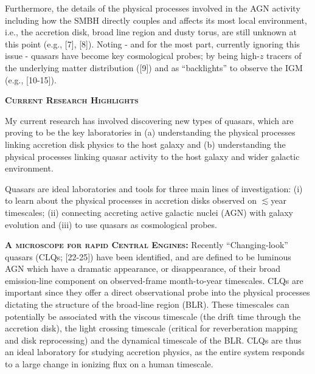 \documentclass[oneside, a4paper, onecolumn, 11pt]{article}
\begin{document}
\smallskip 
\smallskip
\noindent
Furthermore, the details of the physical processes involved in the AGN
activity including how the SMBH directly couples and affects its most
local environment, i.e., the accretion disk, broad line region and
dusty torus, are still unknown at this point (e.g., [7], [8]). Noting
- and for the most part, currently ignoring this issue - quasars have
become key cosmological probes; by being high-$z$ tracers of the
underlying matter distribution ([9]) and as ``backlights'' to observe
the IGM (e.g., [10-15]).



\medskip 
\medskip
\noindent
{\bfseries \large \textsc{\textcolor{Cerulean}{Current Research Highlights}}}

\smallskip
\smallskip
\noindent
My current research has involved discovering new types of quasars,
which are proving to be the key laboratories in (a) understanding the
physical processes linking accretion disk physics to the host galaxy
and (b) understanding the physical processes linking quasar activity
to the host galaxy and wider galactic environment.

\smallskip
\smallskip
\noindent
Quasars are ideal laboratories and tools for
three main lines of investigation: {\rm (i)} to learn about the
physical processes in accretion disks observed on $\lesssim$year
timescales; {\rm (ii)} connecting accreting active galactic nuclei
(AGN) with galaxy evolution and {\rm (iii)} to use quasars as
cosmological probes. 







\smallskip \smallskip
\smallskip
\smallskip
\noindent
\textbf{\textsc{A microscope for rapid Central Engines:}}
Recently ``Changing-look'' quasars (CLQs; [22-25]) have been
identified, and are defined to be luminous AGN which have a dramatic
appearance, or disappearance, of their broad emission-line component
on observed-frame month-to-year timescales.  CLQs are important since
they offer a direct observational probe into the physical processes
dictating the structure of the broad-line region (BLR). These
timescales can potentially be associated with the viscous timescale
(the drift time through the accretion disk), the light crossing
timescale (critical for reverberation mapping and disk reprocessing)
and the dynamical timescale of the BLR.  CLQs are thus an ideal
laboratory for studying accretion physics, as the entire system
responds to a large change in ionizing flux on a human timescale.
\end{document}
